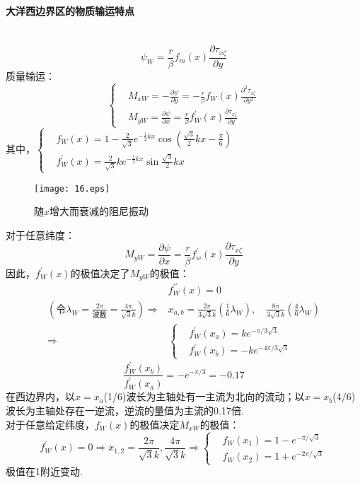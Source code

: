 \documentclass[a4paper,12pt]{article}
\begin{document}
    \paragraph{大洋西边界区的物质输运特点}~{}
    \[
        \psi_{W}=\frac{r}{\beta} f_{m}(x) \frac{\partial \tau_{x \zeta}}{\partial y}
    \]
    质量输运：
    \[
        \left\{
            \begin{aligned}
                &M_{xW}=-\frac{\partial \psi}{\partial y}=-\frac{r}{\beta} f_{W}(x) \frac{\partial^{2} \tau_{x \zeta}}{\partial y^{2}}\\
                &M_{yW}=\frac{\partial \psi}{\partial x}=\frac{r}{\beta} f_{W}^{\prime}(x) \frac{\partial \tau_{x \zeta}}{\partial y}
            \end{aligned}
        \right.
    \]
    其中，$\displaystyle\left\{\begin{aligned}&f_{W}(x)=1-\frac{2}{\sqrt{3}} e^{-\frac{1}{2} k x} \cos \left(\frac{\sqrt{3}}{2} k x-\frac{\pi}{6}\right)\\&f_{W}^{\prime}(x)=\frac{2}{\sqrt{3}} k e^{-\frac{1}{2} k x} \sin \frac{\sqrt{3}}{2} k x\end{aligned}\right.$
    \begin{figure}[H]
        \centering\texttt{[image: 16.eps]}
        \caption*{\large 随$x$增大而衰减的阻尼振动}
    \end{figure}
    对于任意纬度：
    \[
        M_{y W}=\frac{\partial \psi}{\partial x}=\frac{r}{\beta} f_{w}^{\prime}(x) \frac{\partial \tau_{x \zeta}}{\partial y}
    \]
    因此，$\displaystyle f_W^{\prime}(x)$的极值决定了$\displaystyle M_{yW}$的极值：
    \[
        \begin{aligned}
            &f_W^{\prime\prime}(x)=0 \\
            (\mbox{令}\lambda_W=\frac{2\pi}{\mbox{波数}}=\frac{4\pi}{\sqrt{3}k})
            \Rightarrow &x_{a, b}=\frac{2 \pi}{3 \sqrt{3} k}\left(\frac{1}{6} \lambda_{W}\right), \quad \frac{8 \pi}{3 \sqrt{3} k}\left(\frac{4}{6} \lambda_{W}\right)\\
            \Rightarrow &
            \left\{\begin{aligned}
                &f_{W}^{\prime}\left(x_{a}\right)=k e^{-\pi / 3 \sqrt{3}}\\
                &f_{W}^{\prime}\left(x_{b}\right)=-k e^{-4\pi / 3 \sqrt{3}}
            \end{aligned}\right.
        \end{aligned}
    \]
    \[
        \frac{f_{W}^{\prime}\left(x_{b}\right)} { f_{W}^{\prime}\left(x_{a}\right)}=-e^{-\pi / 3}=-0.17
    \]
    在西边界内，以$x=x_a$(1/6)波长为主轴处有一主流为北向的流动；以$x=x_b$(4/6)波长为主轴处存在一逆流，逆流的量值为主流的0.17倍.\\
    对于任意给定纬度，$\displaystyle f_W(x)$的极值决定$\displaystyle M_{xW}$的极值：
    \[
        f_W^{\prime}(x)=0\Rightarrow x_{1,2}=\frac{2\pi}{\sqrt{3}k},\frac{4\pi}{\sqrt{3}k}\Rightarrow \left\{\begin{aligned}
            &f_{W}\left(x_{1}\right)=1-e^{-\pi/\sqrt{3}}\\
            &f_{W}\left(x_{2}\right)=1+e^{-2\pi/\sqrt{3}}
        \end{aligned}\right.
    \]
    极值在1附近变动.
\end{document}
